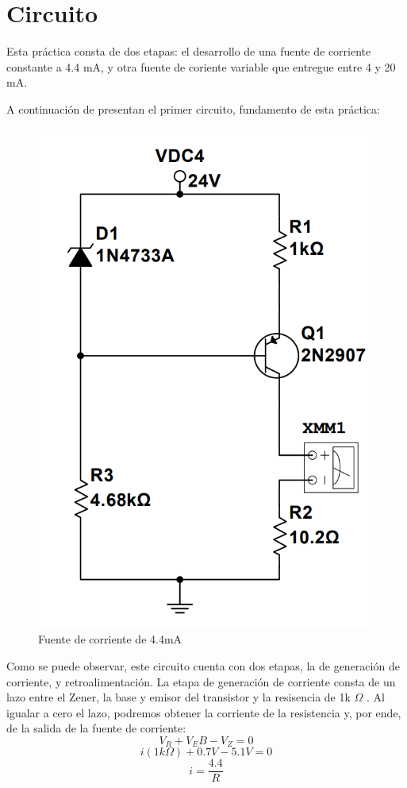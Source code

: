 \documentclass{article}
\begin{document}
\section{Circuito}
Esta práctica consta de dos etapas: el desarrollo de una fuente de corriente constante a 4.4 mA, y otra fuente
 de coriente variable que entregue entre 4 y 20 mA.

A continuación de presentan el primer circuito, fundamento de esta práctica:
\begin{figure}[h]
    \centering
    \includegraphics[scale=0.35]{Screenshot 2022-05-25 012610.png}
    \caption{Fuente de corriente de 4.4mA}
    \label{Fig: Fuente de corriente de 4.4 mA}
\end{figure}

Como se puede observar, este circuito cuenta con dos etapas, la de generación de corriente, y retroalimentación. La 
etapa de generación de corriente consta de un lazo entre el Zener, la base y emisor del transistor y la resisencia de 
1k \(\Omega\) . Al igualar a cero el lazo, podremos obtener la corriente de la resistencia y, por ende, de la salida de 
la fuente de corriente:
\[ V_R + V_EB - V_Z = 0 \]
\[ i(1k \Omega ) + 0.7V -5.1V = 0 \]
\[ i = \frac{4.4}{R} \]
\end{document}
